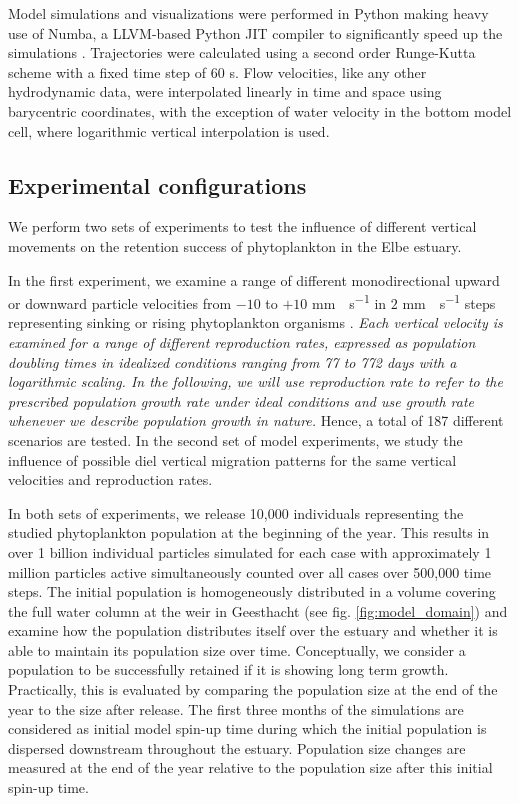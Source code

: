\documentclass[npg, manuscript]{copernicus}
\begin{document}
Model simulations and visualizations were performed in Python making heavy use of Numba, a LLVM-based Python JIT compiler \citep{Lam2015} to significantly speed up the simulations \citep{Vennell2021}.
Trajectories were calculated using a second order Runge-Kutta scheme with a fixed time step of 60 \unit{s}.
Flow velocities, like any other hydrodynamic data, were interpolated linearly in time and space using barycentric coordinates, with the exception of water velocity in the bottom model cell, where logarithmic vertical interpolation is used.

\subsection{Experimental configurations}

We perform two sets of experiments to test the influence of different vertical movements on the retention success of phytoplankton in the Elbe estuary.

In the first experiment, we examine a range of different monodirectional upward or downward particle velocities from $-10$ to $+10$ \unit{mm\;s^{-1}} in $2$ \unit{mm\;s^{-1}} steps representing sinking or rising phytoplankton organisms \citep{Fennessy1996}.
\textit{
    Each vertical velocity is examined for a range of different reproduction rates, expressed as population doubling times in idealized conditions ranging from 77 to 772 days with a logarithmic scaling.
    In the following, we will use reproduction rate to refer to the prescribed population growth rate under ideal conditions and use growth rate whenever we describe population growth in nature. 
}
Hence, a total of 187 different scenarios are tested.
In the second set of model experiments, we study the influence of possible diel vertical migration patterns for the same vertical velocities and reproduction rates.

In both sets of experiments, we release 10,000 individuals representing the studied phytoplankton population at the beginning of the year.
This results in over 1 billion individual particles simulated for each case with approximately 1 million particles active simultaneously counted over all cases over 500,000 time steps.
The initial population is homogeneously distributed in a volume covering the full water column at the weir in Geesthacht (see fig. \ref{fig:model_domain}) and examine how the population distributes itself over the estuary and whether it is able to maintain its population size over time.
Conceptually, we consider a population to be successfully retained if it is showing long term growth. 
Practically, this is evaluated by comparing the population size at the end of the year to the size after release.
The first three months of the simulations are considered as initial model spin-up time during which the initial population is dispersed downstream throughout the estuary.
Population size changes are measured at the end of the year relative to the population size after this initial spin-up time.
\end{document}
